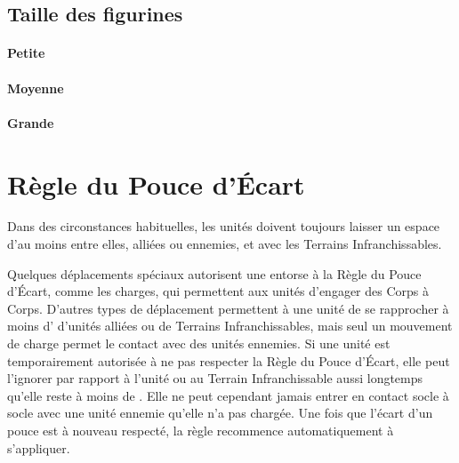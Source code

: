 \subsection{Taille des figurines}
\label{modelheight}


\paragraph{Petite}


\paragraph{Moyenne}


\paragraph{Grande}


\newpage
\section{Règle du Pouce d'Écart}

Dans des circonstances habituelles, les unités doivent toujours laisser un espace d'au moins  entre elles, alliées ou ennemies, et avec les Terrains Infranchissables. 

Quelques déplacements spéciaux autorisent une entorse à la Règle du Pouce d'Écart, comme les charges, qui permettent aux unités d'engager des Corps à Corps. D'autres types de déplacement permettent à une unité de se rapprocher à moins d' d'unités alliées ou de Terrains Infranchissables, mais seul un mouvement de charge permet le contact avec des unités ennemies. Si une unité est temporairement autorisée à ne pas respecter la Règle du Pouce d'Écart, elle peut l'ignorer par rapport à l'unité ou au Terrain Infranchissable aussi longtemps qu'elle reste à moins de . Elle ne peut cependant jamais entrer en contact socle à socle avec une unité ennemie qu'elle n'a pas chargée. Une fois que l'écart d'un pouce est à nouveau respecté, la règle recommence automatiquement à s'appliquer.


